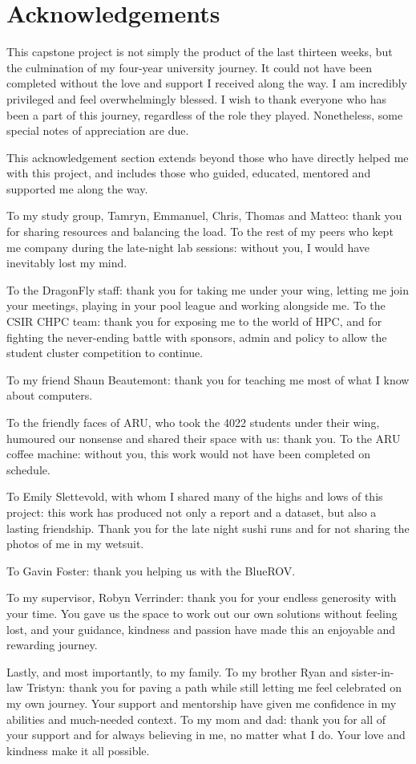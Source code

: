 \chapter{Acknowledgements}
\label{ch:ack}

This capstone project is not simply the product of the last thirteen weeks, but the culmination of my four-year university journey. It could not have been completed without the love and support I received along the way. I am incredibly privileged and feel overwhelmingly blessed. I wish to thank everyone who has been a part of this journey, regardless of the role they played. Nonetheless, some special notes of appreciation are due.

This acknowledgement section extends beyond those who have directly helped me with this project, and includes those who guided, educated, mentored and supported me along the way.

To my study group, Tamryn, Emmanuel, Chris, Thomas and Matteo: thank you for sharing resources and balancing the load.
To the rest of my peers who kept me company during the late-night lab sessions: without you, I would have inevitably lost my mind.

To the DragonFly staff: thank you for taking me under your wing, letting me join your meetings, playing in your pool league and working alongside me.
To the CSIR CHPC team: thank you for exposing me to the world of HPC, and for fighting the never-ending battle with sponsors, admin and policy to allow the student cluster competition to continue.

To my friend Shaun Beautemont: thank you for teaching me most of what I know about computers.

To the friendly faces of ARU, who took the 4022 students under their wing, humoured our nonsense and shared their space with us: thank you.
To the ARU coffee machine: without you, this work would not have been completed on schedule.

To Emily Slettevold, with whom I shared many of the highs and lows of this project: this work has produced not only a report and a dataset, but also a lasting friendship. Thank you
for the late night sushi runs and for not sharing the photos of me in my wetsuit.

To Gavin Foster: thank you helping us with the BlueROV.

To my supervisor, Robyn Verrinder: thank you for your endless generosity with your time. You gave us the space to work out our own solutions without feeling lost, and your guidance, kindness and passion have made this an enjoyable and rewarding journey.

Lastly, and most importantly, to my family. To my brother Ryan and sister-in-law Tristyn: thank you for paving a path while still letting me feel celebrated on my own journey. Your support and mentorship have given me confidence in my abilities and much-needed context.
To my mom and dad: thank you for all of your support and for always believing in me, no matter what I do. Your love and kindness make it all possible.
